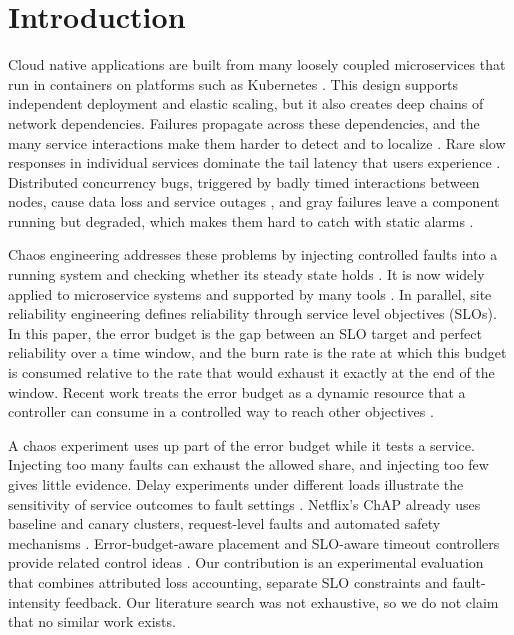 \documentclass[a4paper,fleqn,11pt]{cas-dc}
\begin{document}
\section{Introduction}\label{sec:intro}

Cloud native applications are built from many loosely coupled microservices that run in containers on platforms such as Kubernetes \citep{kratzke2017understanding,burns2016borg}. This design supports independent deployment and elastic scaling, but it also creates deep chains of network dependencies. Failures propagate across these dependencies, and the many service interactions make them harder to detect and to localize \citep{soldani2023anomaly}. Rare slow responses in individual services dominate the tail latency that users experience \citep{dean2013tail}. Distributed concurrency bugs, triggered by badly timed interactions between nodes, cause data loss and service outages \citep{lu2022cloudraid}, and gray failures leave a component running but degraded, which makes them hard to catch with static alarms \citep{ye2026a3sm}.

Chaos engineering addresses these problems by injecting controlled faults into a running system and checking whether its steady state holds \citep{basiri2016chaos}. It is now widely applied to microservice systems and supported by many tools \citep{owotogbe2026chaos,esen2026chaos}. In parallel, site reliability engineering defines reliability through service level objectives (SLOs). In this paper, the error budget is the gap between an SLO target and perfect reliability over a time window, and the burn rate is the rate at which this budget is consumed relative to the rate that would exhaust it exactly at the end of the window. Recent work treats the error budget as a dynamic resource that a controller can consume in a controlled way to reach other objectives \citep{souza2026bahya}.

A chaos experiment uses up part of the error budget while it tests a service. Injecting too many faults can exhaust the allowed share, and injecting too few gives little evidence. Delay experiments under different loads illustrate the sensitivity of service outcomes to fault settings \citep{ahmad2024exploring}. Netflix's ChAP already uses baseline and canary clusters, request-level faults and automated safety mechanisms \citep{basiri2019automating}. Error-budget-aware placement and SLO-aware timeout controllers provide related control ideas \citep{souza2026bahya,hanada2025slo}. Our contribution is an experimental evaluation that combines attributed loss accounting, separate SLO constraints and fault-intensity feedback. Our literature search was not exhaustive, so we do not claim that no similar work exists.
\end{document}
